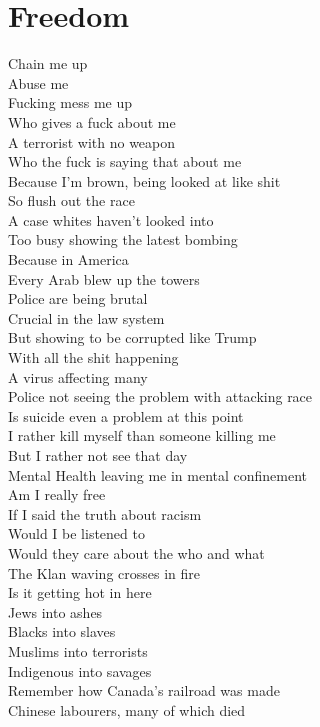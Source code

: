 \documentclass[12pt, b5paper]{article}
\begin{document}
\section{Freedom}
\par Chain me up
\\Abuse me
\\Fucking mess me up
\\Who gives a fuck about me
\\A terrorist with no weapon
\\Who the fuck is saying that about me
\\Because I'm brown, being looked at like shit
\\So flush out the race
\\A case whites haven't looked into
\\Too busy showing the latest bombing
\\Because in America
\\Every Arab blew up the towers
\\Police are being brutal
\\Crucial in the law system
\\But showing to be corrupted like Trump
\\With all the shit happening
\\A virus affecting many
\\Police not seeing the problem with attacking race
\\Is suicide even a problem at this point
\\I rather kill myself than someone killing me
\\But I rather not see that day
\\Mental Health leaving me in mental confinement
\\Am I really free
\\If I said the truth about racism
\\Would I be listened to
\\Would they care about the who and what
\\The Klan waving crosses in fire
\\Is it getting hot in here
\\Jews into ashes
\\Blacks into slaves
\\Muslims into terrorists
\\Indigenous into savages
\\Remember how Canada's railroad was made
\\Chinese labourers, many of which died
\end{document}
